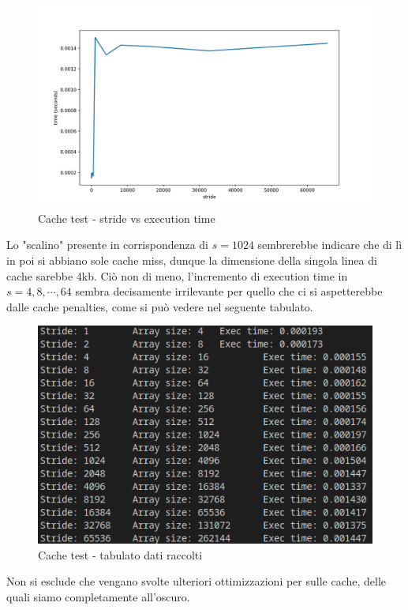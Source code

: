\documentclass[letterpaper, 11pt]{article}
\begin{document}
\begin{multicols}{2}
  \begin{figure}[H]
    \centering
    \includegraphics[width = 1.1 \linewidth]{../LocalOpts/cache_graph.png}
    \caption{Cache test - stride vs execution time}
  \end{figure}

  Lo "scalino" presente in corrispondenza di $s = 1024$ sembrerebbe indicare che di lì in poi si abbiano sole cache miss, dunque la dimensione della singola linea di cache sarebbe 4kb. Ciò non di meno, l'incremento di execution time in $s = 4, 8, \cdots, 64$ sembra decisamente irrilevante per quello che ci si aspetterebbe dalle cache penalties, come si può vedere nel seguente tabulato.

  \begin{figure}[H]
    \centering
    \includegraphics[width = 1 \linewidth]{../LocalOpts/cache_tab.png}
    \caption{Cache test - tabulato dati raccolti}
  \end{figure}

  Non si esclude che vengano svolte ulteriori ottimizzazioni per sulle cache, delle quali siamo completamente all'oscuro.

\end{multicols}
\end{document}
